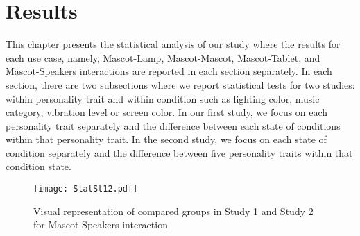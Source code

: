 \chapter{Results}
\label{ch:results}
This chapter presents the statistical analysis of our study where the results
for each use case, namely, Mascot-Lamp, Mascot-Mascot, Mascot-Tablet, and
Mascot-Speakers interactions are reported in each section separately.
In each section, there are two subsections where we report statistical tests for two
studies: within personality trait and within condition such as lighting color, music
category, vibration level or screen color.
In our first study, we focus on each personality trait separately
and the difference between each state of conditions within that personality trait.
In the second study, we focus on each state of condition separately
and the difference between five personality traits within that condition state.

\begin{figure}[H]
    \centering
    \texttt{[image: StatSt12.pdf]}
    \caption{Visual representation of compared groups in Study 1 and Study 2 for Mascot-Speakers interaction}
    \label{fig:Stat12}
\end{figure}
